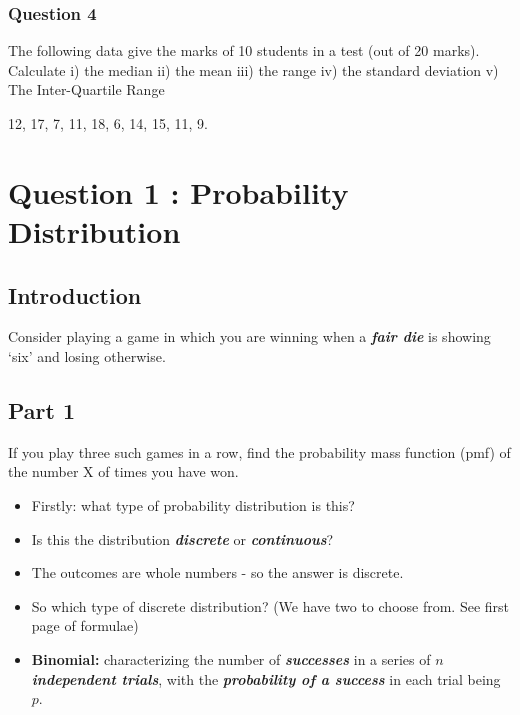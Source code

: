 \documentclass[12pt]{report}
\begin{document}
{{%

\subsubsection{Question 4}
The following data give the marks of 10 students in a test (out of 20 marks). Calculate
i) the median    ii) the mean     iii) the range    iv) the standard deviation v) The Inter-Quartile Range

12, 17, 7, 11, 18, 6, 14, 15, 11, 9.



\section*{Question 1 : Probability Distribution}

\subsection*{Introduction}{\LARGE Consider playing a game in which you are winning when a \textbf{\emph{fair die}} is showing `six'
	and losing otherwise.}
\subsection*{Part 1}{\LARGE If you play three such games in a row, find the probability mass function (pmf) of the number
	X of times you have won.}

{\LARGE
	\begin{itemize}
		\item Firstly: what type of probability distribution is this?
		
		\item Is this the distribution \textbf{\emph{discrete}} or  \textbf{\emph{continuous}}?
		
		\item The outcomes are whole numbers - so the answer is discrete.
		
		\item So which type of discrete distribution? (We have two to choose from. See first page of formulae)
		
		
		\item \textbf{Binomial:} characterizing the number of \textbf{\emph{successes}} in a series of \textbf{\emph{$n$ independent trials}}, with the \textbf{\emph{probability of a success}} in each trial being $p$.
		

\end{itemize}}}}
\end{document}
